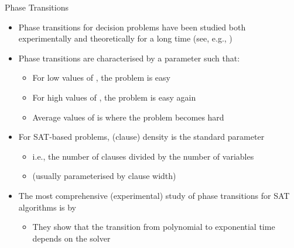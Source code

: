 \documentclass{beamer}
\begin{document}
\begin{frame}{Phase Transitions}
  \begin{itemize}
    \item Phase transitions for \alert{decision problems} have been studied both
          \alert{experimentally} and \alert{theoretically} for a long time (see,
          e.g., \textcite{DBLP:conf/ijcai/CheesemanKT91})\pause
    \item Phase transitions are characterised by a parameter 
          such that:
    \begin{itemize}
      \item For \alert{low} values of , the problem is
            \alert{easy}
      \item For \alert{high} values of , the problem is
            \alert{easy} again
      \item \alert{Average} values of  is where the problem
            becomes \alert{hard}\pause
    \end{itemize}
    \item For SAT-based problems, \alert{(clause) density} is the standard
          parameter
          \begin{itemize}
            \item i.e., the number of \alert{clauses} divided by the number of
                  \alert{variables}
            \item (usually parameterised by \alert{clause width})\pause
          \end{itemize}
    \item The most comprehensive (experimental) study of phase transitions for
          \alert{SAT algorithms} is
          by~\textcite{DBLP:journals/constraints/CoarfaDASV03}
          \begin{itemize}
            \item They show that the transition from polynomial to exponential
                  time \alert{depends on the solver}
          \end{itemize}
  \end{itemize}
\end{frame}
\end{document}
